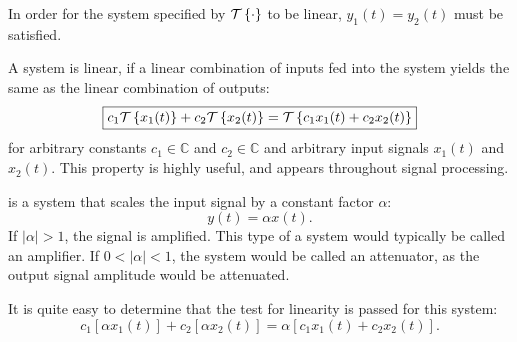 \begin{marginfigure}[-3cm]
\begin{center}
\end{center}
\label{fig:linearity_block}
\caption{In order for the system specified by $\spop$ to be linear,
  $y_1(t) = y_2(t)$ must be satisfied.}
\end{marginfigure}

A system is linear, if a linear combination of inputs fed into the
system yields the same as the linear combination of outputs:
\begin{equation}
\boxed{
c_1 \spop[x_1(t)] + c_2 \spop[ x_2(t) ] = \spop[c_1 x_1(t) + c_2 x_2(t)]}
\end{equation}
for arbitrary constants $c_1 \in \mathbb{C}$ and $c_2 \in \mathbb{C}$
and arbitrary input signals $x_1(t)$ and $x_2(t)$. This property is
highly useful, and appears throughout signal processing.

 is a system that scales the
input signal by a constant factor $\alpha$:
\begin{equation}
  y(t) = \alpha x(t).
\end{equation}
If $|\alpha| >1$, the signal is amplified. This type of a system would
typically be called an amplifier. If $0<|\alpha|<1$, the system would
be called an attenuator, as the output signal amplitude would be
attenuated.

It is quite easy to determine that the test for linearity is passed for this system:
\begin{equation}
c_1 [\alpha x_1(t)] + c_2 [\alpha x_2(t)] = \alpha [c_1 x_1(t) + c_2 x_2(t)].
\end{equation}

